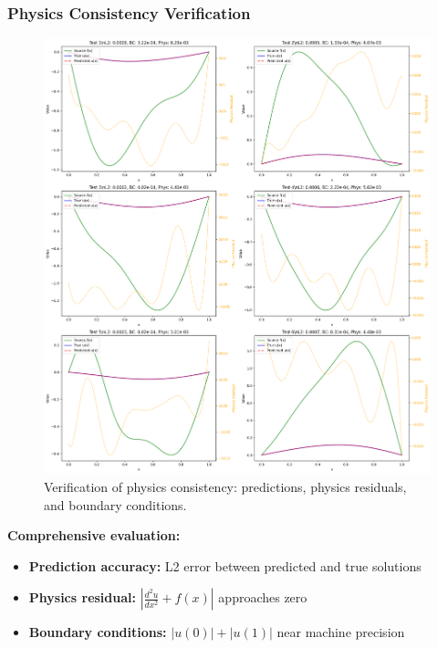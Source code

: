 \documentclass[notes]{beamer}
\begin{document}
\begin{frame}
\frametitle{Physics Consistency Verification}

\begin{figure}[ht]
    \centering
    \includegraphics[width=\textwidth]{figs/pi_physics_verification.png}
    \caption*{Verification of physics consistency: predictions, physics residuals, and boundary conditions.}
\end{figure}

\textbf{Comprehensive evaluation:}
\begin{itemize}
    \item \textbf{Prediction accuracy:} L2 error between predicted and true solutions
    \item \textbf{Physics residual:} $\left|\frac{d^2u}{dx^2} + f(x)\right|$ approaches zero
    \item \textbf{Boundary conditions:} $|u(0)| + |u(1)|$ near machine precision
\end{itemize}

\end{frame}
\end{document}
